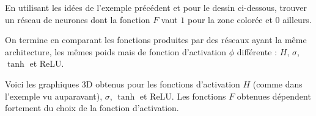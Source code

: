 \documentclass[11pt,class=report,crop=false]{standalone}
\begin{document}
\begin{exercicecours}
En utilisant les idées de l'exemple précédent et pour le dessin ci-dessous, trouver un réseau de neurones dont la fonction $F$ vaut $1$ pour la zone colorée et $0$ ailleurs.



\end{exercicecours}


\begin{exemple}
On termine en comparant les fonctions produites par des réseaux ayant la même architecture, les mêmes poids mais de fonction d'activation $\phi$ différente : $H$, $\sigma$, $\tanh$ et ReLU.


Voici les graphiques 3D obtenus pour les fonctions d'activation $H$ (comme dans l'exemple vu auparavant), $\sigma$, $\tanh$ et ReLU. Les fonctions $F$ obtenues dépendent fortement du choix de la fonction d'activation.


\end{exemple}
\end{document}
